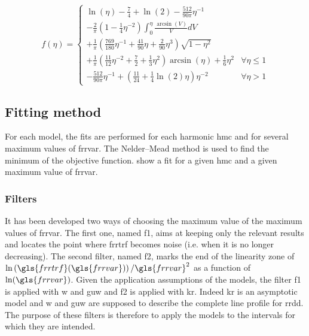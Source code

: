 \medskip

\begin{equation}
  f(\eta) =
    \begin{cases}
      \ln(\eta) - \frac{7}{4} + \ln(2) - \frac{512}{90 \pi} \eta^{-1} \\[5mm]
      - \frac{2}{\pi} \left( 1 - \frac{1}{4}\eta^{-2} \right) \int_0^\eta \frac{\arcsin(V)}{V} dV \\[5mm]
      + \frac{1}{\pi} \left( \frac{769}{180} \eta^{-1} + \frac{41}{90} \eta + \frac{2}{90}\eta^3 \right) \sqrt{ 1 - \eta^2 } \\[5mm]
      + \frac{1}{\pi} \left( \frac{11}{12} \eta^{-2} + \frac{7}{2} + \frac{1}{3} \eta^2 \right) \arcsin(\eta) + \frac{1}{6} \eta^2
      & \forall \eta \leq 1 \\[1cm]
      - \frac{512}{90 \pi} \eta^{-1} + \left( \frac{11}{24} + \frac{1}{4} \ln(2) \eta \right) \eta^{-2}
      & \forall \eta > 1
    \end{cases}
\end{equation}

\subsection{Fitting method}

For each model, the fits are performed for each harmonic \gls{hmc} and for several maximum values of \gls{frrvar}.
The Nelder–Mead method is used to find the minimum of the objective function.
 show a fit for a given \gls{hmc} and a given maximum value of \gls{frrvar}.


\subsubsection{Filters}\label{sec:filters}

It has been developed two ways of choosing the maximum value of the maximum values of \gls{frrvar}.
The first one, named \gls{f1}, aims at keeping only the relevant results and locates the point where \gls{frrtrf} becomes noise (i.e. when it is no longer decreasing).
The second filter, named \gls{f2}, marks the end of the linearity zone of \( \ln \left( \gls{frrtrf}(\gls{frrvar}) \right) / \gls{frrvar}^2 \) as a function of \( \ln(\gls{frrvar}) \).
Given the application assumptions of the models, the filter \gls{f1} is applied with \gls{w} and \gls{guw} and \gls{f2} is applied with \gls{kr}.
Indeed \gls{kr} is an asymptotic model and \gls{w} and \gls{guw} are supposed to describe the complete line profile for \gls{rrdd}.
The purpose of these filters is therefore to apply the models to the intervals for which they are intended.

